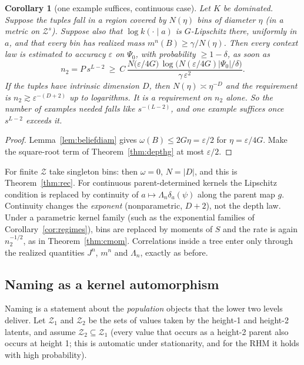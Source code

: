 \documentclass[11pt]{article}
\newtheorem{corollary}[theorem]{Corollary}
\theoremstyle{definition}
\begin{document}
\begin{corollary}[one example suffices, continuous case]\label{cor:depthg}
Let $K$ be dominated. Suppose the tuples fall in a region covered by $N(\eta)$ bins of diameter
$\eta$ (in a metric on $\mathcal Z^s$). Suppose also that $\log k(\cdot\mid a)$ is $G$-Lipschitz
there, uniformly in $a$,
and that every bin has realized mass $m^n(B)\ge\gamma/N(\eta)$. Then every context law is estimated
to accuracy $\varepsilon$ on $\Psi_0$, with probability $\ge1-\delta$, as soon as
\[
n_2=P\,s^{L-2}\ \ge\ C\,\frac{N\!\big(\varepsilon/4G\big)\,\log\!\big(N(\varepsilon/4G)|\Psi_0|/\delta\big)}{\gamma\,\varepsilon^2}.
\]
If the tuples have intrinsic dimension $D$, then $N(\eta)\asymp\eta^{-D}$ and the requirement is
$n_2\gtrsim\varepsilon^{-(D+2)}$ up to logarithms. It is a requirement on $n_2$ alone. So the number
of examples needed falls like $s^{-(L-2)}$, and one example suffices once $s^{L-2}$ exceeds it.
\end{corollary}
\begin{proof}
Lemma~\ref{lem:beliefdiam} gives $\omega(B)\le2G\eta=\varepsilon/2$ for $\eta=\varepsilon/4G$. Make the
square-root term of Theorem~\ref{thm:depthg} at most $\varepsilon/2$.
\end{proof}
\noindent For finite $\mathcal Z$ take singleton bins: then $\omega=0$, $N=|D|$, and this is
Theorem~\ref{thm:rec}. For continuous parent-determined kernels the Lipschitz condition is replaced
by continuity of $a\mapsto\Lambda_n\delta_a(\psi)$ along the parent map $g$. Continuity changes the \emph{exponent} (nonparametric, $D+2$), not the
depth law. Under a parametric kernel family (such as the exponential families of
Corollary~\ref{cor:regimes}), bins are replaced by moments of $S$ and the rate is again
$n_2^{-1/2}$, as in Theorem~\ref{thm:cmom}. Correlations inside a tree enter only through the
realized quantities $J^n$, $m^n$ and $\Lambda_n$, exactly as before.

\subsection{Naming as a kernel automorphism}
Naming is a statement about the \emph{population} objects that the lower two levels deliver. Let
$\mathcal Z_1$ and $\mathcal Z_2$ be the sets of values taken by the height-1 and height-2 latents,
and assume $\mathcal Z_2\subseteq\mathcal Z_1$ (every value that occurs as a height-2 parent also
occurs at height 1; this is automatic under stationarity, and for the RHM it holds with high
probability).
\end{document}
